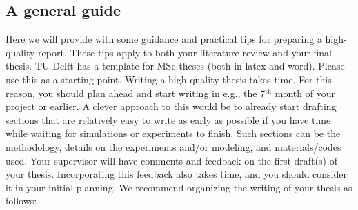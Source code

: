\documentclass{article}
\begin{document}
\subsection{A general guide}
Here we will provide with some guidance and practical tips for preparing a high-quality report. These tips apply to both your literature review and your final thesis. TU Delft has a template for MSc theses (both in latex and word). Please use this as a starting point. Writing a high-quality thesis takes time. For this reason, you should plan ahead and start writing in e.g., the 7$^{\text{th}}$ month of your project or earlier. A clever approach to this would be to already start drafting sections that are relatively easy to write as early as possible if you have time while waiting for simulations or experiments to finish. Such sections can be the methodology, details on the experiments and/or modeling, and materials/codes used. Your supervisor will have comments and feedback on the first draft(s) of your thesis. Incorporating this feedback also takes time, and you should consider it in your initial planning. We recommend organizing the writing of your thesis as follows:
\end{document}
